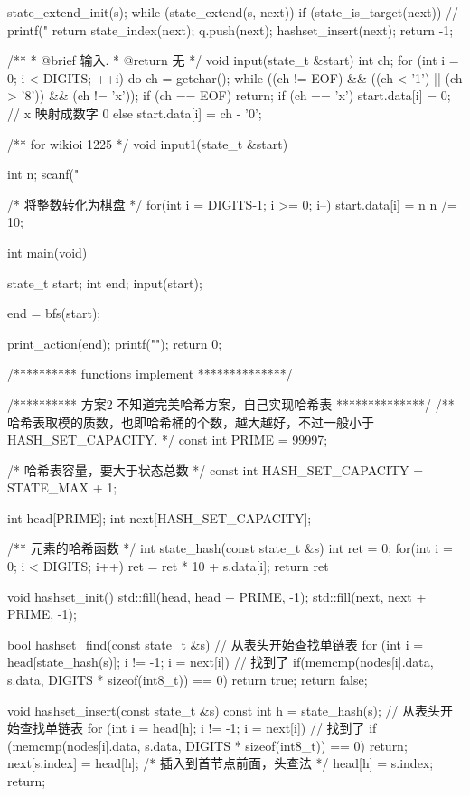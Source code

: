 \begin{Codex}[label=eight_digits_bfs2.c]
{{        state_extend_init(s);
        while (state_extend(s, next)) {
            if (state_is_target(next)) {
                // printf("%
                return state_index(next);
            }
            q.push(next);
            hashset_insert(next);
        }
    }
    return -1;
}

/**
 * @brief 输入.
 * @return 无
 */
void input(state_t &start) {
    int ch;
    for (int i = 0; i < DIGITS; ++i) {
        do {
            ch = getchar();
        } while ((ch != EOF) && ((ch < '1') || (ch > '8')) && (ch != 'x'));
        if (ch == EOF) return;
        if (ch == 'x') start.data[i] = 0; // x 映射成数字 0
        else           start.data[i] = ch - '0';
    }
}

/** for wikioi 1225 */
void input1(state_t &start) {
    int n;
    scanf("%

    /* 将整数转化为棋盘 */
    for(int i = DIGITS-1; i >= 0; i--) {
        start.data[i] = n %
        n /= 10;
    }
}

int main(void) {
    state_t start;
    int end;
    input(start);

    end = bfs(start);

    print_action(end);
    printf("\n");
    return 0;
}

/********** functions implement **************/

/********** 方案2 不知道完美哈希方案，自己实现哈希表 **************/
/** 哈希表取模的质数，也即哈希桶的个数，越大越好，不过一般小于 HASH_SET_CAPACITY. */
const int PRIME = 99997;

/* 哈希表容量，要大于状态总数 */
const int HASH_SET_CAPACITY = STATE_MAX + 1;

int head[PRIME];
int next[HASH_SET_CAPACITY];

/** 元素的哈希函数  */
int state_hash(const state_t &s) {
    int ret = 0;
    for(int i = 0; i < DIGITS; i++) ret = ret * 10 + s.data[i];
    return ret %
}

void hashset_init() {
    std::fill(head, head + PRIME, -1);
    std::fill(next, next + PRIME, -1);
}

bool hashset_find(const state_t &s) {
    // 从表头开始查找单链表
    for (int i = head[state_hash(s)]; i != -1; i = next[i]) {
        // 找到了
        if(memcmp(nodes[i].data, s.data,
                DIGITS * sizeof(int8_t)) == 0)
            return true;
    }
    return false;
}

void hashset_insert(const state_t &s) {
    const int h = state_hash(s);
    // 从表头开始查找单链表
    for (int i = head[h]; i != -1; i = next[i]) {
        // 找到了
        if (memcmp(nodes[i].data, s.data,
                DIGITS * sizeof(int8_t)) == 0)
            return;
    }
    next[s.index] = head[h]; /* 插入到首节点前面，头查法 */
    head[h] = s.index;
    return;
}


\end{Codex}
